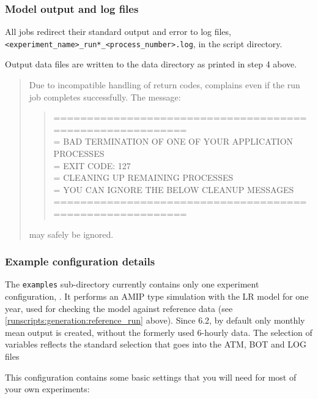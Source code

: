 \subsubsection{Model output and log files}

All jobs redirect their standard output and error to log files, \verb|<experiment_name>_run*_<process_number>.log|, in the script directory.

Output data files are written to the data directory as printed in step 4 above.

\begin{quote}\colorbox{dgray}{\parbox{\linewidth}{ 
  Due to incompatible handling of return codes, \thunder{} complains even
  if the run job completes successfully. The message:

  \begin{quote}{\ttfamily \raggedright \noindent
==========================================================\\
=   BAD TERMINATION OF ONE OF YOUR APPLICATION PROCESSES\\
=   EXIT CODE: 127\\
=   CLEANING UP REMAINING PROCESSES\\
=   YOU CAN IGNORE THE BELOW CLEANUP MESSAGES\\
==========================================================
  }\end{quote}

  may safely be ignored.
}}\end{quote}

\subsubsection{Example configuration details}
\label{runscripts:generation:example_configuration}

The \texttt{examples} sub-directory currently contains only one experiment
configuration, .
It performs an AMIP type simulation with the LR model for one year, used for
checking the model against reference data (see
\ref{runscripts:generation:reference_run} above). Since \echam{} 6.2, by default
only monthly mean output is created, without the formerly used 6-hourly data.
The selection of variables reflects the standard selection that goes into the
ATM, BOT and LOG files

This configuration contains some basic settings that you will need for most of
your own experiments:

